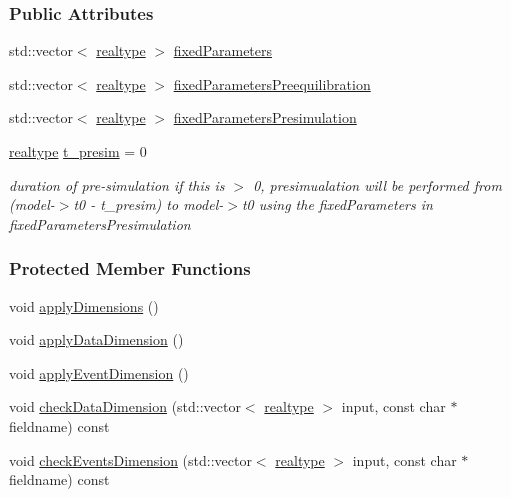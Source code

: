 \subsubsection*{Public Attributes}
\begin{DoxyCompactItemize}
\item 
std\+::vector$<$ \mbox{\hyperlink{namespaceamici_a1bdce28051d6a53868f7ccbf5f2c14a3}{realtype}} $>$ \mbox{\hyperlink{classamici_1_1_exp_data_ac1d5115134ec1c839f1e913724ceb2b4}{fixed\+Parameters}}
\item 
std\+::vector$<$ \mbox{\hyperlink{namespaceamici_a1bdce28051d6a53868f7ccbf5f2c14a3}{realtype}} $>$ \mbox{\hyperlink{classamici_1_1_exp_data_acee836e015941b3984c44e1c7423b101}{fixed\+Parameters\+Preequilibration}}
\item 
std\+::vector$<$ \mbox{\hyperlink{namespaceamici_a1bdce28051d6a53868f7ccbf5f2c14a3}{realtype}} $>$ \mbox{\hyperlink{classamici_1_1_exp_data_a86fb66aedc21085f868fb6509a45c92d}{fixed\+Parameters\+Presimulation}}
\item 
\mbox{\label{classamici_1_1_exp_data_acb5fa397f91ea45e9e2890036d339969}} 
\mbox{\hyperlink{namespaceamici_a1bdce28051d6a53868f7ccbf5f2c14a3}{realtype}} \mbox{\hyperlink{classamici_1_1_exp_data_acb5fa397f91ea45e9e2890036d339969}{t\+\_\+presim}} = 0
\begin{DoxyCompactList}\small\item\em duration of pre-\/simulation if this is $>$ 0, presimualation will be performed from (model-\/$>$t0 -\/ t\+\_\+presim) to model-\/$>$t0 using the fixed\+Parameters in fixed\+Parameters\+Presimulation \end{DoxyCompactList}\end{DoxyCompactItemize}
\subsubsection*{Protected Member Functions}
\begin{DoxyCompactItemize}
\item 
void \mbox{\hyperlink{classamici_1_1_exp_data_a81a6a21cd5d905d5b6199f3a97030f61}{apply\+Dimensions}} ()
\item 
void \mbox{\hyperlink{classamici_1_1_exp_data_ae0f51d05d7fbaf7f61e0795301bad084}{apply\+Data\+Dimension}} ()
\item 
void \mbox{\hyperlink{classamici_1_1_exp_data_ae872e294aa6f34e90844905fd203eb16}{apply\+Event\+Dimension}} ()
\item 
void \mbox{\hyperlink{classamici_1_1_exp_data_acad115e928a8b0bc8e90ebf9553d3eed}{check\+Data\+Dimension}} (std\+::vector$<$ \mbox{\hyperlink{namespaceamici_a1bdce28051d6a53868f7ccbf5f2c14a3}{realtype}} $>$ input, const char $\ast$fieldname) const
\item 
void \mbox{\hyperlink{classamici_1_1_exp_data_adcf5587f972fdef595fff78123f5118a}{check\+Events\+Dimension}} (std\+::vector$<$ \mbox{\hyperlink{namespaceamici_a1bdce28051d6a53868f7ccbf5f2c14a3}{realtype}} $>$ input, const char $\ast$fieldname) const
\end{DoxyCompactItemize}
